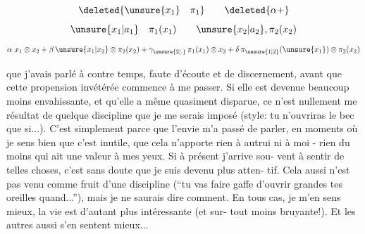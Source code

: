 \[
\deleted{\unsure{x_1}\quad\pi_1}\qquad\deleted{\alpha+}
\]
\[
\unsure{x_1|a_1}\quad\pi_1(x_1)\qquad \unsure{x_2|a_2},\pi_2(x_2)
\]
\[
\alpha\ x_1\otimes x_2+\beta\,\unsure{x_1|x_2}\otimes\pi_2(x_2)
+\gamma_{\unsure{2|.}}\,\pi_1(x_1)\otimes x_2+\delta\,\pi_{\unsure{1|2}}(\unsure{x_1})\otimes\pi_2(x_2)
\]

que j'avais parlé à contre temps, faute d'écoute et de discernement, avant que
cette propension invétérée commence à me passer. Si elle est devenue beaucoup
moins envahissante, et qu'elle a même quasiment disparue, ce n'est nullement \linebreak
me résultat de quelque discipline que je me serais imposé (style: tu n'ouvriras
le bec que si...). C'est simplement parce que l'envie m'a passé de parler, en 
moments où je sens bien que c'est inutile, que cela n'apporte rien à autrui ni
à moi - rien du moins qui ait une valeur à mes yeux. Si à présent j'arrive sou-\linebreak
vent à sentir de telles choses, c'est sans doute que je suis devenu plus atten-\linebreak
tif. Cela aussi n'est pas venu comme fruit d'une discipline (``tu vas faire
gaffe d'ouvrir grandes tes oreilles quand...''), mais je ne saurais dire comment.
En tous cas, je m'en sens mieux, la vie est d'autant plus intéressante (et sur-\linebreak
tout moins bruyante!). Et les autres aussi s'en sentent mieux...

